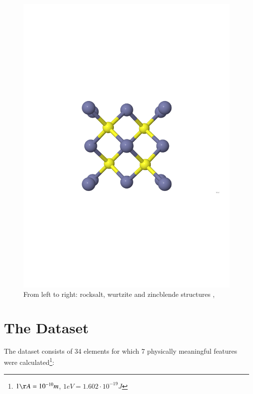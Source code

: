 \documentclass[11pt,oneside,czech,american]{book} %
\theoremstyle{plain}
\theoremstyle{definition}
\begin{document}
\begin{figure}[H]
	\includegraphics[scale=0.26]{zincblende_nolabels.pdf}
	\caption{From left to right: rocksalt, wurtzite and zincblende structures \parencite{jmol}, \parencite{RS_ZB_WZ}}
	\label{jmol_struct}
\end{figure}


\section{The Dataset}
The dataset consists of 34 elements for which 7 physically meaningful features were calculated\footnote{$1\AA = 10^{-10} m$, $1 eV = 1.602 \cdot 10^{-19} J$}:
\end{document}
